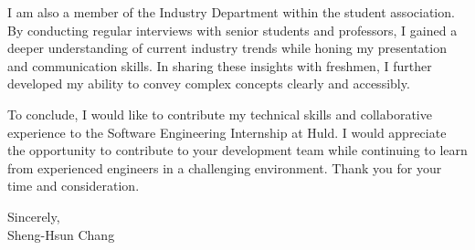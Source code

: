 \documentclass[12pt,a4paper]{article}
\newcommand{\Name}{Sheng-Hsun Chang}
\begin{document}
I am also a member of the Industry Department within the student association.
By conducting regular interviews with senior students and professors, I gained a deeper understanding of current 
industry trends while honing my presentation and communication skills. In sharing these insights with freshmen, 
I further developed my ability to convey complex concepts clearly and accessibly.

To conclude, I would like to contribute my technical skills and collaborative experience to the Software Engineering Internship at Huld. I would appreciate the opportunity to contribute to your development team while continuing to learn from experienced engineers in a challenging environment. Thank you for your time and consideration.


Sincerely,\\
\vspace{10pt}
\Name
\end{document}
